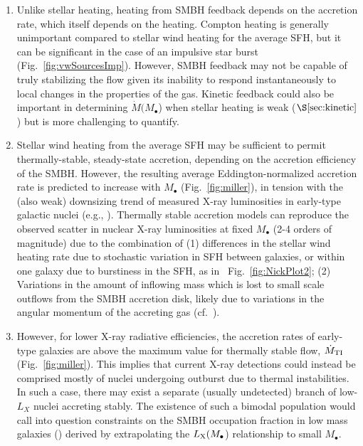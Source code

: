 \documentclass[usenatbib,fleqn]{mn2e}
\newcommand{\Mbh}[1][]{M_{\bullet#1}}
\begin{document}
\begin{enumerate}
\item Unlike stellar heating, heating from SMBH feedback depends on
  the accretion rate, which itself depends on the heating.  Compton
  heating is generally unimportant compared to stellar wind heating
  for the average SFH, but it can be significant in the case of an impulsive
  star burst (Fig.~\ref{fig:vwSourcesImp}).  However, SMBH feedback may not
  be capable of truly stabilizing the flow given its inability
  to respond instantaneously to local changes in the properties of the
  gas.  Kinetic feedback could also be important in determining
  $\dot{M}(M_{\bullet}$) when stellar heating is weak
  ($\S\ref{sec:kinetic}$) but is more challenging to quantify.

\item Stellar wind heating from the average SFH may be sufficient to
  permit thermally-stable, steady-state accretion, depending on the
  accretion efficiency of the SMBH.  However, the resulting average
  Eddington-normalized accretion rate is predicted to increase with
  $M_{\bullet}$ (Fig.~\ref{fig:miller}), in tension with the (also
  weak) downsizing trend of measured X-ray luminosities in early-type
  galactic nuclei (e.g., \citealt{Miller+15}).  Thermally stable
  accretion models can reproduce the observed scatter in nuclear X-ray
  luminosities at fixed $\Mbh$ (2-4 orders of magnitude) due to the
  combination of (1) differences in the stellar wind heating rate due
  to stochastic variation in SFH between galaxies, or within one
  galaxy due to burstiness in the SFH, as in
  ~Fig.~\ref{fig:NickPlot2}; (2) Variations in the amount of inflowing
  mass which is lost to small scale outflows from the SMBH accretion
  disk, likely due to variations in the angular momentum of the
  accreting gas (cf.~\citealt{Pellegrini10}).

\item However, for lower X-ray radiative efficiencies, the accretion
  rates of early-type galaxies are above the maximum value for
  thermally stable flow, $\dot{M}_{\rm TI}$ (Fig.~\ref{fig:miller}).
  This implies that current X-ray detections could instead be
  comprised mostly of nuclei undergoing outburst due to thermal
  instabilities.  In such a case, there may exist a separate (usually
  undetected) branch of low-$L_X$ nuclei accreting stably.  The
  existence of such a bimodal population would call into question
  constraints on the SMBH occupation fraction in low mass galaxies
  (\citealt{Miller+15}) derived by extrapolating the $L_{\rm
    X}(M_{\bullet}$) relationship to small $M_{\bullet}$.


\end{enumerate}
\end{document}
